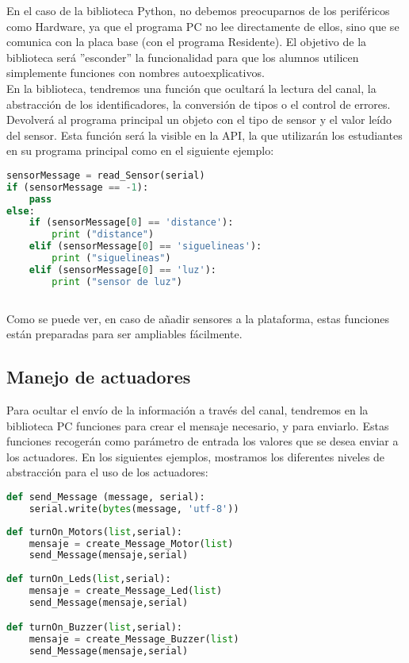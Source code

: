 En el caso de la biblioteca Python, no debemos preocuparnos de los periféricos como Hardware, ya que el programa PC no lee directamente de ellos, sino que se comunica con la placa base (con el programa Residente). El objetivo de la biblioteca será ''esconder'' la funcionalidad para que los alumnos utilicen simplemente funciones con nombres autoexplicativos.\\
En la biblioteca, tendremos una función que ocultará la lectura del canal, la abstracción de los identificadores, la conversión de tipos o el control de errores. Devolverá al programa principal un objeto con el tipo de sensor y el valor leído del sensor. 
Esta función será la visible en la API, la que utilizarán los estudiantes en su programa principal como en el siguiente ejemplo:

\begin{lstlisting}[language=python,caption={Lectura de sensores en el Programa Principal}]
sensorMessage = read_Sensor(serial)
if (sensorMessage == -1):
	pass
else:
	if (sensorMessage[0] == 'distance'):
		print ("distance")
	elif (sensorMessage[0] == 'siguelineas'):
		print ("siguelineas")
	elif (sensorMessage[0] == 'luz'):
		print ("sensor de luz")
	
\end{lstlisting}

Como se puede ver, en caso de añadir sensores a la plataforma, estas funciones están preparadas para ser ampliables fácilmente.

\subsection{Manejo de actuadores}\label{subsec:actuadoresPython}
Para ocultar el envío de la información a través del canal, tendremos en la biblioteca PC funciones para crear el mensaje necesario, y para enviarlo. Estas funciones recogerán como parámetro de entrada los valores que se desea enviar a los actuadores. En los siguientes ejemplos, mostramos los diferentes niveles de abstracción para el uso de los actuadores:\\

\begin{lstlisting}[language=python,caption={Función de la biblioteca PC para el envío de información a través del canal}]
def send_Message (message, serial):
	serial.write(bytes(message, 'utf-8'))		
\end{lstlisting}
\begin{lstlisting}[language=python,caption={Funciones de la biblioteca PC para el envío de mensajes a los actuadores}]
def turnOn_Motors(list,serial):
	mensaje = create_Message_Motor(list)
	send_Message(mensaje,serial)
		
def turnOn_Leds(list,serial):
	mensaje = create_Message_Led(list)
	send_Message(mensaje,serial)

def turnOn_Buzzer(list,serial):
	mensaje = create_Message_Buzzer(list)
	send_Message(mensaje,serial)
\end{lstlisting}


